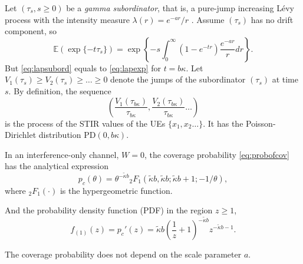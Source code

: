 \documentclass[conference]{IEEEtran}
\theoremstyle{definition}
\theoremstyle{plain}
\begin{document}
                    
          Let $(\tau_s, s\geq 0)$ be a \textit{gamma subordinator}, that is, a pure-jump increasing Lévy process with the intensity measure $\lambda(r) = e^{-ar}/r$ . Assume $(\tau_s)$ has no drift component, so
          \begin{equation}
            \label{eq:lapsubord}
            \mathbb{E}(\exp\{-t \tau_s\}) = \exp\left\{-s \int_0^{\infty}(1-e^{-t r})\frac{e^{-ar}}{r} dr \right\}.
          \end{equation}
          But \eqref{eq:lapsubord} equals to \eqref{eq:lapexp} for $t=b \kappa$. Let $V_1(\tau_s) \geq V_2(\tau_s)\geq \dots \geq 0 $ denote the jumps of the subordinator $(\tau_s)$ at time $s$. By definition, the sequence
          \begin{equation}
            \left(\frac{V_1(\tau_{b\kappa})}{\tau_{b\kappa}},\frac{V_2(\tau_{b\kappa})}{\tau_{b\kappa}} \dots \right)
          \end{equation}
          is the process of the STIR values of the UEs $\{x_1,x_2 \dots\}$. It has the Poisson-Dirichlet distribution PD$(0, b \kappa)$.
                    

          In an interference-only channel, $W=0$, the coverage probability \eqref{eq:probofcov} has the analytical expression
          \begin{equation}
p_c(\theta) =  \theta^{-\tilde{\kappa}b} {_2F_1}\left(\tilde{\kappa}b, \tilde{\kappa}b;\tilde{\kappa}b + 1; -1/\theta \right),
          \end{equation}
          where $_2F_1(\cdot)$ is the hypergeometric function. 

          And the probability density function (PDF) in the region $z \geq 1$,
          \begin{equation}
            f_{(1)}(z) = p_c'(z)= \tilde{\kappa} b  \left(\frac{1}{z }+1\right)^{- \tilde{\kappa}b } z^{- \tilde{\kappa}b -1}.
          \end{equation}

          The coverage probability does not depend on the scale parameter $a$.
           
          

                    

          
\end{document}
